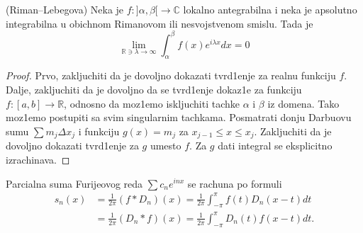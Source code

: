 \documentclass[a4paper,12pt]{article}
\newcommand{\RR}{\mathbb{R}}
\newcommand{\CC}{\mathbb{C}}
\begin{document}
\begin{lema}(Riman--Lebegova) Neka je $f: ]\alpha, \beta[ \to \CC$ lokalno antegrabilna i neka je apsolutno integrabilna u obichnom Rimanovom ili nesvojstvenom smislu. Tada je 
\[\lim_{\RR \ni \lambda \to \infty} \int_{\alpha}^{\beta} f(x) e^{i \lambda x} dx = 0\]
\end{lema}
\begin{proof}
Prvo, zakljuchiti da je dovoljno dokazati tvrd1enje za realnu funkciju $f$. Dalje, zakljuchiti da je dovoljno da se tvrd1enje dokaz1e za funkciju $f: [a,b] \to \RR$, odnosno da moz1emo iskljuchiti tachke $\alpha$ i  $\beta$ iz domena. Tako moz1emo postupiti sa svim singularnim tachkama. Posmatrati donju Darbuovu sumu $\sum m_j \Delta x_j$ i  funkciju $g(x) = m_j$ za $x_{j-1} \leq x \leq x_j$. Zakljuchiti da je dovoljno dokazati tvrd1enje za $g$ umesto $f$. Za $g$ dati integral se eksplicitno izrachinava.
\end{proof}

\begin{nap}
	Parcialna suma Furijeovog reda $\sum c_n e^{inx}$ se rachuna po formuli
	\begin{align*}
	 	s_n(x) &= \frac{1}{2\pi}(f*D_n)(x) = \frac{1}{2\pi}\int_{-\pi}^{\pi} f(t)D_n(x-t)dt\\
	&=\frac{1}{2\pi}(D_n*f)(x) =   \frac{1}{2\pi}\int_{-\pi}^{\pi} D_n(t)f(x-t)dt. 
	\end{align*}
\end{nap}
\end{document}
